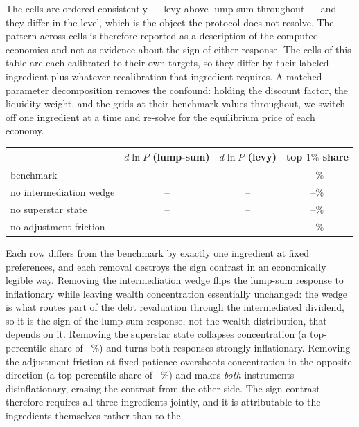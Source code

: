 \documentclass[12pt]{article}
\providecommand{\pendingnum}{\textit{--}}
\providecommand{\LadBenchLS}{\pendingnum}\providecommand{\LadBenchLevy}{\pendingnum}
\providecommand{\LadBenchTopOne}{\pendingnum}
\providecommand{\LadNoWedgeLS}{\pendingnum}\providecommand{\LadNoWedgeLevy}{\pendingnum}
\providecommand{\LadNoWedgeTopOne}{\pendingnum}
\providecommand{\LadNoSupLS}{\pendingnum}\providecommand{\LadNoSupLevy}{\pendingnum}
\providecommand{\LadNoSupTopOne}{\pendingnum}
\providecommand{\LadNoFricLS}{\pendingnum}\providecommand{\LadNoFricLevy}{\pendingnum}
\providecommand{\LadNoFricTopOne}{\pendingnum}
\begin{document}
\noindent The cells are ordered consistently --- levy above lump-sum
throughout --- and they differ in the level, which is the object the
protocol does not resolve. The pattern across cells is therefore reported
as a description of the computed economies and not as evidence about the
sign of either response.
The cells of this table are each calibrated to their own targets, so
they differ by their labeled ingredient plus whatever recalibration that
ingredient requires. A matched-parameter decomposition removes the
confound: holding the discount factor, the liquidity weight, and the
grids at their benchmark values throughout, we switch off one ingredient
at a time and re-solve for the equilibrium price of each economy.
\begin{center}
\begin{tabular}{lccc}
\toprule
 & $d\ln P$ (lump-sum) & $d\ln P$ (levy) & top $1\%$ share \\
\midrule
benchmark                & $\LadBenchLS$   & $\LadBenchLevy$   & $\LadBenchTopOne\%$ \\
no intermediation wedge  & $\LadNoWedgeLS$ & $\LadNoWedgeLevy$ & $\LadNoWedgeTopOne\%$ \\
no superstar state       & $\LadNoSupLS$   & $\LadNoSupLevy$   & $\LadNoSupTopOne\%$ \\
no adjustment friction   & $\LadNoFricLS$  & $\LadNoFricLevy$  & $\LadNoFricTopOne\%$ \\
\bottomrule
\end{tabular}
\end{center}
\noindent Each row differs from the benchmark by exactly one ingredient
at fixed preferences, and each removal destroys the sign contrast in an
economically legible way. Removing the intermediation wedge flips the
lump-sum response to inflationary while leaving wealth concentration
essentially unchanged: the wedge is what routes part of the debt
revaluation through the intermediated dividend, so it is the sign of the
lump-sum response, not the wealth distribution, that depends on it.
Removing the superstar state collapses concentration (a top-percentile
share of $\LadNoSupTopOne\%$) and turns both responses strongly
inflationary. Removing the adjustment friction at fixed patience
overshoots concentration in the opposite direction (a top-percentile
share of $\LadNoFricTopOne\%$) and makes \emph{both} instruments
disinflationary, erasing the contrast from the other side. The sign
contrast therefore requires all three ingredients jointly, and it is
attributable to the ingredients themselves rather than to the
\end{document}
